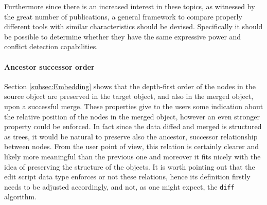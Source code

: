 \documentclass[../Thesis.tex]{subfiles}
\begin{document}
	Furthermore since there is an increased interest in these topics, as 
	witnessed by the great number of publications, a general framework
	to compare properly different tools with similar characteristics 
	should be devised. Specifically it should be possible 
	to determine whether they have the same expressive power and
	conflict detection capabilities.
	
	\paragraph{Ancestor successor order}		
	Section \ref{subsec:Embedding} shows that the depth-first order
	of the nodes in the source object are preserved in the target object,
	and also in the merged object, upon a successful merge.
	These properties give to the users some indication about the relative
	position of the nodes in the merged object, however an even stronger
	property could be enforced. In fact since the data diffed and merged is 
	structured as trees, it would be natural to preserve also the ancestor, 
	successor relationship between nodes.
	From the user point of view, this relation is certainly clearer and likely 
	more meaningful than the previous one and moreover it fits nicely
	with the idea of preserving the structure of the objects.
	It is worth pointing out that the edit script data type enforces
	or not these relations, hence its definition firstly needs to be 
	adjusted accordingly, and not, as one might expect, the \texttt{diff}
	algorithm.
	
	
\end{document}
